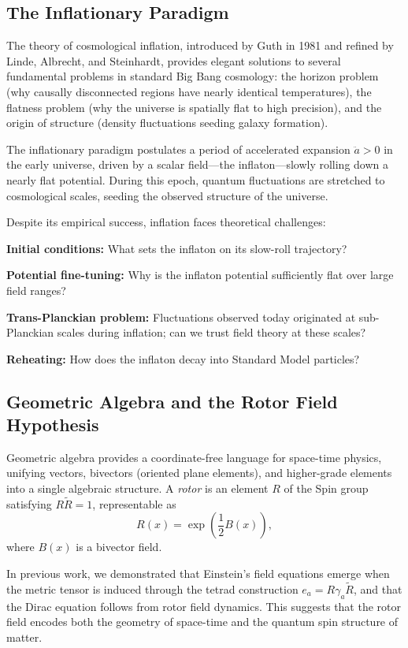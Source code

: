\documentclass[11pt,a4paper]{article}
\numberwithin{equation}{section}
\theoremstyle{plain}
\theoremstyle{definition}
\theoremstyle{remark}
\begin{document}
\subsection{The Inflationary Paradigm}

The theory of cosmological inflation, introduced by Guth in 1981 and refined by Linde, Albrecht, and Steinhardt, provides elegant solutions to several fundamental problems in standard Big Bang cosmology: the horizon problem (why causally disconnected regions have nearly identical temperatures), the flatness problem (why the universe is spatially flat to high precision), and the origin of structure (density fluctuations seeding galaxy formation).

The inflationary paradigm postulates a period of accelerated expansion $\ddot{a} > 0$ in the early universe, driven by a scalar field---the inflaton---slowly rolling down a nearly flat potential. During this epoch, quantum fluctuations are stretched to cosmological scales, seeding the observed structure of the universe.

Despite its empirical success, inflation faces theoretical challenges:

\textbf{Initial conditions:} What sets the inflaton on its slow-roll trajectory?

\textbf{Potential fine-tuning:} Why is the inflaton potential sufficiently flat over large field ranges?

\textbf{Trans-Planckian problem:} Fluctuations observed today originated at sub-Planckian scales during inflation; can we trust field theory at these scales?

\textbf{Reheating:} How does the inflaton decay into Standard Model particles?

\subsection{Geometric Algebra and the Rotor Field Hypothesis}

Geometric algebra provides a coordinate-free language for space-time physics, unifying vectors, bivectors (oriented plane elements), and higher-grade elements into a single algebraic structure. A \emph{rotor} is an element $R$ of the Spin group satisfying $R\widetilde{R} = 1$, representable as
\begin{equation}
R(x) = \exp\left(\frac{1}{2}B(x)\right),
\end{equation}
where $B(x)$ is a bivector field.

In previous work, we demonstrated that Einstein's field equations emerge when the metric tensor is induced through the tetrad construction $e_a = R\gamma_a\widetilde{R}$, and that the Dirac equation follows from rotor field dynamics. This suggests that the rotor field encodes both the geometry of space-time and the quantum spin structure of matter.
\end{document}
